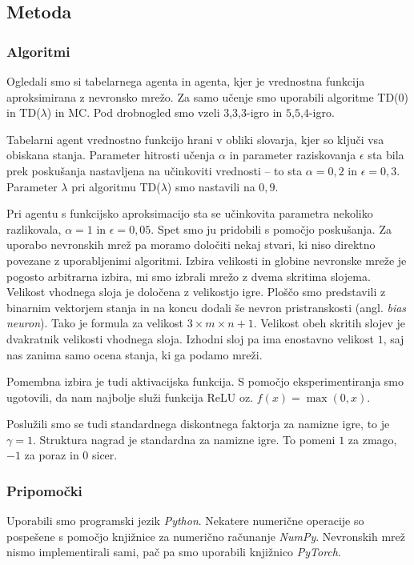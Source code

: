 \documentclass[12pt,a4paper]{amsart}
\theoremstyle{definition} %
\theoremstyle{plain} %
\begin{document}
\subsection{Metoda}

\subsubsection{Algoritmi}
Ogledali smo si tabelarnega agenta in agenta, kjer je vrednostna funkcija aproksimirana z nevronsko mrežo. 
Za samo učenje smo uporabili algoritme TD($0$) in TD($\lambda$) in MC. Pod drobnogled smo vzeli 
$3$,$3$,$3$-igro in $5$,$5$,$4$-igro. 

Tabelarni agent vrednostno funkcijo hrani v obliki slovarja, kjer so ključi vsa obiskana stanja. 
Parameter hitrosti učenja $\alpha$ in parameter raziskovanja $\epsilon$ sta bila prek poskušanja 
nastavljena na učinkoviti vrednosti -- to sta $\alpha = 0,2$ in $\epsilon = 0,3$. Parameter $\lambda$
pri algoritmu TD($\lambda$) smo nastavili na $0,9$.

Pri agentu s funkcijsko aproksimacijo sta se učinkovita parametra nekoliko razlikovala, $\alpha = 1$ 
in $\epsilon = 0,05$. Spet smo ju pridobili s pomočjo poskušanja. Za uporabo nevronskih mrež pa moramo 
določiti nekaj stvari, ki niso direktno povezane z uporabljenimi algoritmi. Izbira velikosti in globine 
nevronske mreže je pogosto arbitrarna izbira, mi smo izbrali mrežo z dvema skritima slojema. Velikost 
vhodnega sloja je določena z velikostjo igre. Ploščo smo predstavili z binarnim vektorjem stanja in na 
koncu dodali še nevron pristranskosti (angl. \textit{bias neuron}). Tako je formula za velikost 
$ 3 \times m \times n + 1$. Velikost obeh skritih slojev je dvakratnik velikosti vhodnega sloja. Izhodni 
sloj pa ima enostavno velikost $1$, saj nas zanima samo ocena stanja, ki ga podamo mreži. 

Pomembna izbira je tudi aktivacijska funkcija. S pomočjo eksperimentiranja smo ugotovili, da nam 
najbolje služi funkcija ReLU oz. $f(x) = \max(0, x)$.

Poslužili smo se tudi standardnega diskontnega faktorja za namizne igre, to je $\gamma = 1$. Struktura 
nagrad je standardna za namizne igre. To pomeni $1$ za zmago, $-1$ za poraz in $0$ sicer.

\subsubsection{Pripomočki}
Uporabili smo programski jezik \textit{Python}. Nekatere numerične operacije so pospešene s pomočjo 
knjižnice za numerično računanje \textit{NumPy}. Nevronskih mrež nismo implementirali sami, pač pa 
smo uporabili knjižnico \textit{PyTorch}.
\end{document}
